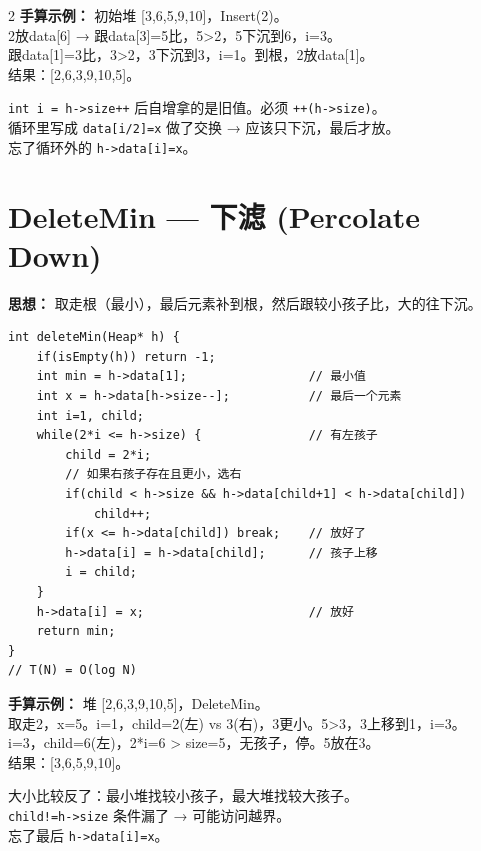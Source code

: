 \documentclass[10pt,a4paper]{article}
\begin{document}
\begin{multicols}{2}
\textbf{手算示例：} 初始堆 [3,6,5,9,10]，Insert(2)。\\
2放data[6] → 跟data[3]=5比，5>2，5下沉到6，i=3。\\
跟data[1]=3比，3>2，3下沉到3，i=1。到根，2放data[1]。\\
结果：[2,6,3,9,10,5]。

\begin{bugbox}
\texttt{int i = h->size++} 后自增拿的是旧值。必须 \texttt{++(h->size)}。\\
循环里写成 \texttt{data[i/2]=x} 做了交换 → 应该只下沉，最后才放。\\
忘了循环外的 \texttt{h->data[i]=x}。
\end{bugbox}

\section*{DeleteMin — 下滤 (Percolate Down)}

\textbf{思想：} 取走根（最小），最后元素补到根，然后跟较小孩子比，大的往下沉。

\begin{lstlisting}
int deleteMin(Heap* h) {
    if(isEmpty(h)) return -1;
    int min = h->data[1];                 // 最小值
    int x = h->data[h->size--];           // 最后一个元素
    int i=1, child;
    while(2*i <= h->size) {               // 有左孩子
        child = 2*i;
        // 如果右孩子存在且更小，选右
        if(child < h->size && h->data[child+1] < h->data[child])
            child++;
        if(x <= h->data[child]) break;    // 放好了
        h->data[i] = h->data[child];      // 孩子上移
        i = child;
    }
    h->data[i] = x;                       // 放好
    return min;
}
// T(N) = O(log N)
\end{lstlisting}

\textbf{手算示例：} 堆 [2,6,3,9,10,5]，DeleteMin。\\
取走2，x=5。i=1，child=2(左) vs 3(右)，3更小。5>3，3上移到1，i=3。\\
i=3，child=6(左)，2*i=6 > size=5，无孩子，停。5放在3。\\
结果：[3,6,5,9,10]。

\begin{bugbox}
大小比较反了：最小堆找较小孩子，最大堆找较大孩子。\\
\texttt{child!=h->size} 条件漏了 → 可能访问越界。\\
忘了最后 \texttt{h->data[i]=x}。
\end{bugbox}


\end{multicols}
\end{document}
